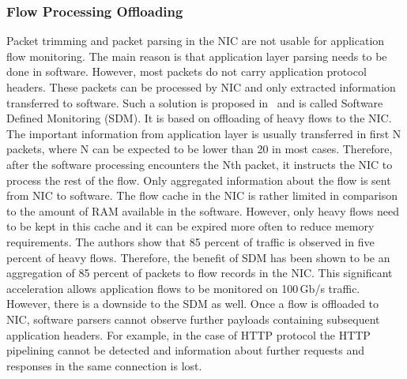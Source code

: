 \subsubsection{Flow Processing Offloading}
Packet trimming and packet parsing in the NIC are not usable for application flow monitoring. The main reason is that application layer parsing needs to be done in software. However, most packets do not carry application protocol headers. These packets can be processed by NIC and only extracted information transferred to software. Such a solution is proposed in~\cite{Kekely-2016-Software} and is called Software Defined Monitoring (SDM). It is based on offloading of heavy flows to the NIC. The important information from application layer is usually transferred in first N packets, where N can be expected to be lower than 20 in most cases. Therefore, after the software processing encounters the Nth packet, it instructs the NIC to process the rest of the flow. Only aggregated information about the flow is sent from NIC to software. The flow cache in the NIC is rather limited in comparison to the amount of RAM available in the software. However, only heavy flows need to be kept in this cache and it can be expired more often to reduce memory requirements. The authors show that 85 percent of traffic is observed in five percent of heavy flows. Therefore, the benefit of SDM has been shown to be an aggregation of 85 percent of packets to flow records in the NIC. This significant acceleration allows application flows to be monitored on 100\,Gb/s traffic. However, there is a downside to the SDM as well. Once a flow is offloaded to NIC, software parsers cannot observe further payloads containing subsequent application headers. For example, in the case of HTTP protocol the HTTP pipelining cannot be detected and information about further requests and responses in the same connection is lost.

